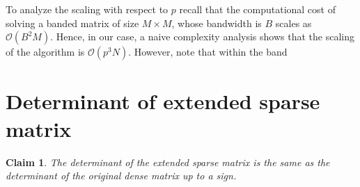 \documentclass[final,leqno]{siamltex}
\newtheorem{claim}[theorem]{Claim}
\begin{document}
To analyze the scaling with respect to $p$ recall that the computational cost of solving a banded matrix of size $M \times M$, whose bandwidth is $B$ scales as $\mathcal{O}(B^2M)$. Hence, in our case, a naive complexity analysis shows that the scaling of the algorithm is $\mathcal{O}(p^3N)$. However, note that within the band

\section{Determinant of extended sparse matrix}


\begin{claim}
The determinant of the extended sparse matrix is the same as the determinant of the original dense matrix up to a sign.
\end{claim}
\end{document}
